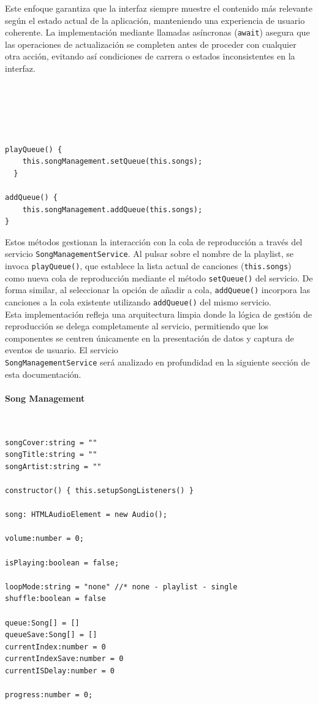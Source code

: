 \documentclass[11pt, a4paper]{article}
\begin{document}
                Este enfoque garantiza que la interfaz siempre muestre el contenido más relevante según el estado actual de la aplicación, manteniendo una experiencia de usuario coherente. La implementación mediante llamadas asíncronas (\texttt{await}) asegura que las operaciones de actualización se completen antes de proceder con cualquier otra acción, evitando así condiciones de carrera o estados inconsistentes en la interfaz.  \\ \\ \\ \\ \\ \\

                \begin{lstlisting}[caption={playQueue() y addQueue()}]
playQueue() {
    this.songManagement.setQueue(this.songs);
  }

addQueue() {
    this.songManagement.addQueue(this.songs);
}
                \end{lstlisting}

                Estos métodos gestionan la interacción con la cola de reproducción a través del servicio \texttt{SongManagementService}. Al pulsar sobre el nombre de la playlist, se invoca \texttt{playQueue()}, que establece la lista actual de canciones (\texttt{this.songs}) como nueva cola de reproducción mediante el método \texttt{setQueue()} del servicio. De forma similar, al seleccionar la opción de añadir a cola, \texttt{addQueue()} incorpora las canciones a la cola existente utilizando \texttt{addQueue()} del mismo servicio. \\

                Esta implementación refleja una arquitectura limpia donde la lógica de gestión de reproducción se delega completamente al servicio, permitiendo que los componentes se centren únicamente en la presentación de datos y captura de eventos de usuario. El servicio \\ \texttt{SongManagementService} será analizado en profundidad en la siguiente sección de esta documentación.

                \paragraph{Song Management}
                ‎

                \begin{lstlisting}[caption={Atributos Song Management}]
songCover:string = ""
songTitle:string = ""
songArtist:string = ""

constructor() { this.setupSongListeners() }

song: HTMLAudioElement = new Audio();

volume:number = 0;

isPlaying:boolean = false;

loopMode:string = "none" //* none - playlist - single
shuffle:boolean = false

queue:Song[] = []
queueSave:Song[] = []
currentIndex:number = 0
currentIndexSave:number = 0
currentISDelay:number = 0

progress:number = 0;
                \end{lstlisting}
\end{document}
